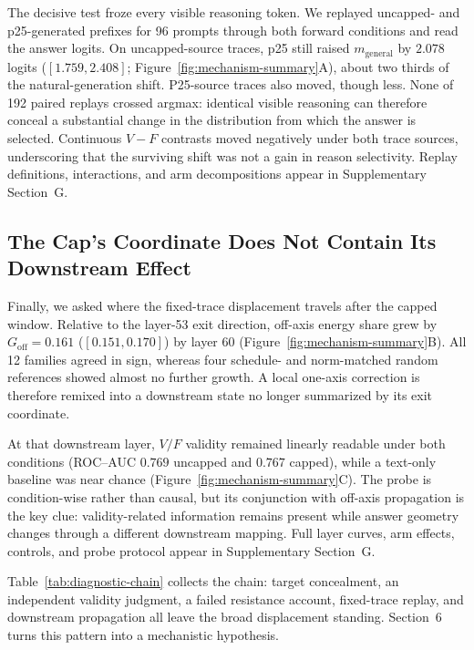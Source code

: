 \documentclass[letterpaper]{article} %
\begin{document}
The decisive test froze every visible reasoning token. We replayed uncapped- and p25-generated prefixes for 96 prompts through both forward conditions and read the answer logits. On uncapped-source traces, p25 still raised $m_{\mathrm{general}}$ by $2.078$ logits ($[1.759,2.408]$; Figure~\ref{fig:mechanism-summary}A), about two thirds of the natural-generation shift. P25-source traces also moved, though less. None of 192 paired replays crossed argmax: identical visible reasoning can therefore conceal a substantial change in the distribution from which the answer is selected. Continuous $V-F$ contrasts moved negatively under both trace sources, underscoring that the surviving shift was not a gain in reason selectivity. Replay definitions, interactions, and arm decompositions appear in Supplementary Section~G.

\subsection{The Cap's Coordinate Does Not Contain Its Downstream Effect}

Finally, we asked where the fixed-trace displacement travels after the capped window. Relative to the layer-53 exit direction, off-axis energy share grew by $G_{\mathrm{off}}=0.161$ ($[0.151,0.170]$) by layer 60 (Figure~\ref{fig:mechanism-summary}B). All 12 families agreed in sign, whereas four schedule- and norm-matched random references showed almost no further growth. A local one-axis correction is therefore remixed into a downstream state no longer summarized by its exit coordinate.

At that downstream layer, $V/F$ validity remained linearly readable under both conditions (ROC--AUC $0.769$ uncapped and $0.767$ capped), while a text-only baseline was near chance (Figure~\ref{fig:mechanism-summary}C). The probe is condition-wise rather than causal, but its conjunction with off-axis propagation is the key clue: validity-related information remains present while answer geometry changes through a different downstream mapping. Full layer curves, arm effects, controls, and probe protocol appear in Supplementary Section~G.

Table~\ref{tab:diagnostic-chain} collects the chain: target concealment, an independent validity judgment, a failed resistance account, fixed-trace replay, and downstream propagation all leave the broad displacement standing. Section~6 turns this pattern into a mechanistic hypothesis.
\end{document}
